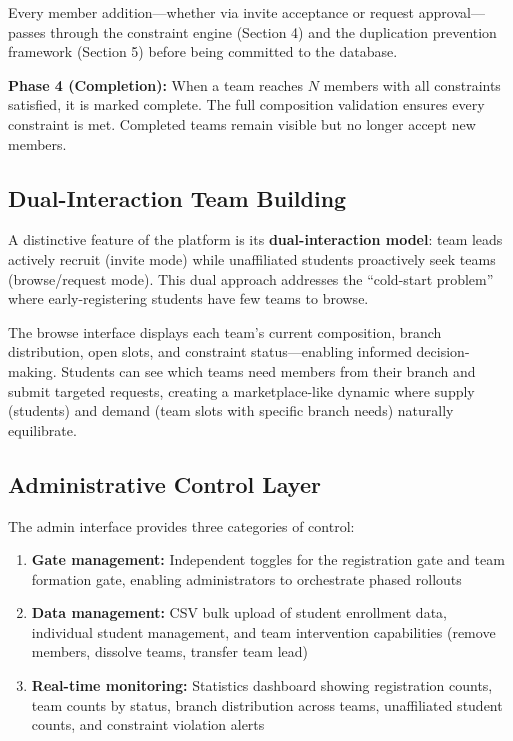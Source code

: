 \documentclass[12pt,a4paper]{article}
\begin{document}
Every member addition---whether via invite acceptance or request approval---passes through the constraint engine (Section 4) and the duplication prevention framework (Section 5) before being committed to the database.

\textbf{Phase 4 (Completion):} When a team reaches $N$ members with all constraints satisfied, it is marked complete. The full composition validation ensures every constraint is met. Completed teams remain visible but no longer accept new members.

\subsection{Dual-Interaction Team Building}

A distinctive feature of the platform is its \textbf{dual-interaction model}: team leads actively recruit (invite mode) while unaffiliated students proactively seek teams (browse/request mode). This dual approach addresses the ``cold-start problem'' where early-registering students have few teams to browse.

The browse interface displays each team's current composition, branch distribution, open slots, and constraint status---enabling informed decision-making. Students can see which teams need members from their branch and submit targeted requests, creating a marketplace-like dynamic where supply (students) and demand (team slots with specific branch needs) naturally equilibrate.

\subsection{Administrative Control Layer}

The admin interface provides three categories of control:

\begin{enumerate}[noitemsep,topsep=3pt]
    \item \textbf{Gate management:} Independent toggles for the registration gate and team formation gate, enabling administrators to orchestrate phased rollouts
    \item \textbf{Data management:} CSV bulk upload of student enrollment data, individual student management, and team intervention capabilities (remove members, dissolve teams, transfer team lead)
    \item \textbf{Real-time monitoring:} Statistics dashboard showing registration counts, team counts by status, branch distribution across teams, unaffiliated student counts, and constraint violation alerts
\end{enumerate}
\end{document}

